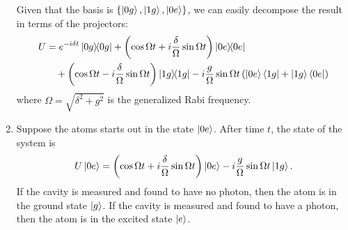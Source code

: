 \documentclass{article}
\theoremstyle{definition}
\newcommand{\f}[2]{\frac{#1}{#2}}
\newcommand{\lp}{\left(}
\newcommand{\rp}{\right)}
\begin{document}
\begin{enumerate}[label=(\alph*)]
Given that the basis is $\{ \ket{0g}, \ket{1g}, \ket{0e} \}$, we can easily decompose the result in terms of the projectors: 
\begin{align*}
U &= e^{-i\delta t} \ketbra{0g} + \lp \cos \Omega t + i \f{\delta}{\Omega} \sin\Omega t \rp \ketbra{0e}  \\ 
&\quad + 
\lp \cos \Omega t - i \f{\delta}{\Omega} \sin\Omega t \rp \ketbra{1g} - i \f{g}{\Omega} \sin \Omega t \lp \ket{0e}\bra{1g} + \ket{1g}\bra{0e} \rp
\end{align*}
where $\Omega = \sqrt{\delta^2 + g^2}$ is the generalized Rabi frequency. 


\item Suppose the atoms starts out in the state $\ket{0e}$. After time $t$, the state of the system is 
\begin{align*}
U\ket{0e} = \lp \cos \Omega t + i \f{\delta}{\Omega} \sin\Omega t \rp \ket{0e} - i \f{g}{\Omega} \sin\Omega t \ket{1g}.
\end{align*}
If the cavity is measured and found to have no photon, then the atom is in the ground state $\ket{g}$. If the cavity is measured and found to have a photon, then the atom is in the excited state $\ket{e}$. 


\end{enumerate}
\end{document}
